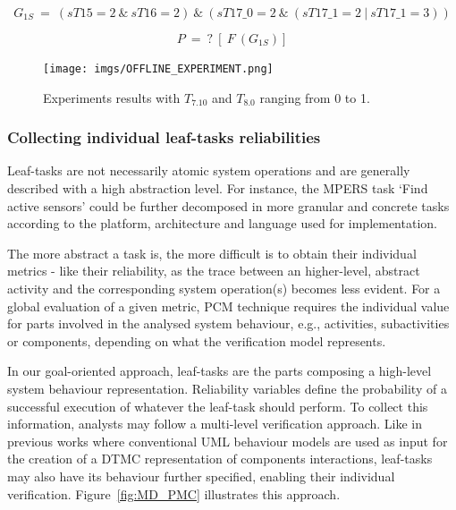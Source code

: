 \begin{equation}\label{eq:G1s}
G_{1S}\ =\ (sT15=2\ \&\ sT16=2)\ \&\ (sT17\_0=2\ \&\ (sT17\_1=2\ |\ sT17\_1=3))
\end{equation}

\begin{equation}\label{eq:PCTLg1s}
P\ =\ ?\ [\ F\ (G_{1S})]
\end{equation}

\begin{figure}[ht!]
\centering
\texttt{[image: imgs/OFFLINE\_EXPERIMENT.png]}
\caption{Experiments results with $T_{7.10}$ and $T_{8.0}$ ranging from 0 to 1.}
\label{fig:OFFLINE_EXPERIMENT}
\end{figure}


\subsubsection{Collecting individual leaf-tasks reliabilities}

Leaf-tasks are not necessarily atomic system operations and are generally described with a high abstraction level. For instance, the MPERS task `Find active sensors' could be further decomposed in more granular and concrete tasks according to the platform, architecture and language used for implementation. 



The more abstract a task is, the more difficult is to 
obtain their individual metrics - like their reliability, as the trace between an higher-level, abstract activity and the corresponding system operation(s) becomes less evident. For a global evaluation of a given metric, PCM technique requires the individual value for parts involved in the analysed system behaviour, e.g., activities, subactivities or components, depending on what the verification model represents.

In our goal-oriented approach, leaf-tasks are the parts composing a high-level system behaviour representation. Reliability variables define the probability of a successful execution of whatever the leaf-task should perform. To collect this information, analysts may follow a multi-level verification approach. Like in previous works where conventional UML behaviour models are used as input for the creation of a DTMC representation of components interactions, leaf-tasks may also have its behaviour further specified, enabling their individual verification. Figure~\ref{fig:MD_PMC} illustrates this approach.


